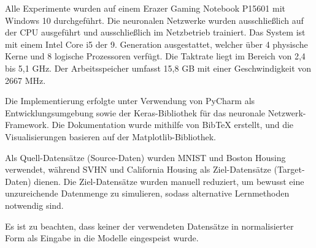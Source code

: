 Alle Experimente wurden auf einem Erazer Gaming Notebook P15601 mit Windows 10 durchgeführt. Die neuronalen Netzwerke wurden ausschließlich auf 
der CPU ausgeführt und ausschließlich im Netzbetrieb trainiert. Das System ist mit einem Intel Core i5 der 9. Generation ausgestattet, welcher 
über 4 physische Kerne und 8 logische Prozessoren verfügt. Die Taktrate liegt im Bereich von 2,4 bis 5,1 GHz. Der Arbeitsspeicher umfasst 15,8 GB 
mit einer Geschwindigkeit von 2667 MHz.

Die Implementierung erfolgte unter Verwendung von PyCharm als Entwicklungsumgebung sowie der Keras-Bibliothek für das neuronale 
Netzwerk-Framework. Die Dokumentation wurde mithilfe von BibTeX erstellt, und die Visualisierungen basieren auf der Matplotlib-Bibliothek.

Als Quell-Datensätze (Source-Daten) wurden MNIST und Boston Housing verwendet, während SVHN und California Housing als Ziel-Datensätze 
(Target-Daten) dienen. Die Ziel-Datensätze wurden manuell reduziert, um bewusst eine unzureichende Datenmenge zu simulieren, sodass alternative 
Lernmethoden notwendig sind.

Es ist zu beachten, dass keiner der verwendeten Datensätze in normalisierter Form als Eingabe in die Modelle eingespeist wurde.
